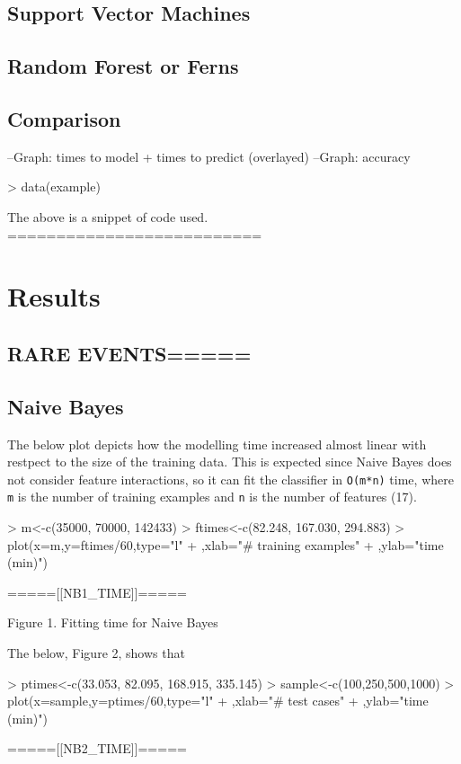 \documentclass[a4paper]{article}
\begin{document}
\begin{multicols}{2}
\subsection*{Support Vector Machines}

\subsection*{Random Forest or Ferns}

\subsection*{Comparison}
--Graph: times to model + times to predict (overlayed)
--Graph: accuracy

\begin{Schunk}
\begin{Sinput}
> data(example)
\end{Sinput}
\end{Schunk}
The above is a snippet of code used. 
==========================


\section*{Results}

\subsection*{RARE EVENTS=====}

\subsection*{Naive Bayes}
The below plot depicts how the modelling time increased almost linear with restpect to the size of the training data. This is expected since Naive Bayes does not consider feature interactions, so it can fit the classifier in \texttt{O(m*n)} time, where \texttt{m} is the number of training examples and \texttt{n} is the number of features (17).
\begin{Schunk}
\begin{Sinput}
> m<-c(35000, 70000, 142433)
> ftimes<-c(82.248, 167.030, 294.883)
> plot(x=m,y=ftimes/60,type="l"
+      ,xlab="# training examples"
+      ,ylab="time (min)")
\end{Sinput}
\end{Schunk}
\begin{center}
=====[[NB1\_TIME]]=====

Figure 1. Fitting time for Naive Bayes
\end{center}
The below, Figure 2, shows that 
\begin{Schunk}
\begin{Sinput}
> ptimes<-c(33.053, 82.095, 168.915, 335.145)
> sample<-c(100,250,500,1000)
> plot(x=sample,y=ptimes/60,type="l"
+      ,xlab="# test cases"
+      ,ylab="time (min)")
\end{Sinput}
\end{Schunk}
\begin{center}
=====[[NB2\_TIME]]=====


\end{center}
\end{multicols}
\end{document}
